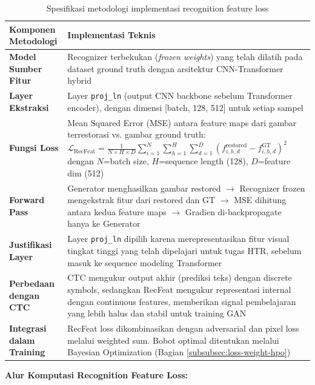 \documentclass[12pt,a4paper]{article}
\begin{document}
\begin{table}[H]
\centering
\caption{Spesifikasi metodologi implementasi recognition feature loss}
\label{tab:recfeat-loss-methodology}
\small
\begin{tabular}{|l|p{10cm}|}
\hline
\textbf{Komponen Metodologi} & \textbf{Implementasi Teknis} \\ \hline
\textbf{Model Sumber Fitur} & Recognizer terbekukan (\textit{frozen weights}) yang telah dilatih pada dataset ground truth dengan arsitektur CNN-Transformer hybrid \\ \hline
\textbf{Layer Ekstraksi} & Layer \texttt{proj\_ln} (output CNN backbone sebelum Transformer encoder), dengan dimensi [batch, 128, 512] untuk setiap sampel \\ \hline
\textbf{Fungsi Loss} & Mean Squared Error (MSE) antara feature maps dari gambar terrestorasi vs. gambar ground truth: 
\newline $\mathcal{L}_{\text{RecFeat}} = \frac{1}{N \times H \times D} \sum_{i=1}^{N} \sum_{h=1}^{H} \sum_{d=1}^{D} (f^{\text{restored}}_{i,h,d} - f^{\text{GT}}_{i,h,d})^2$ 
\newline dengan $N$=batch size, $H$=sequence length (128), $D$=feature dim (512) \\ \hline
\textbf{Forward Pass} & Generator menghasilkan gambar restored $\rightarrow$ Recognizer frozen mengekstrak fitur dari restored dan GT $\rightarrow$ MSE dihitung antara kedua feature maps $\rightarrow$ Gradien di-backpropagate hanya ke Generator \\ \hline
\textbf{Justifikasi Layer} & Layer \texttt{proj\_ln} dipilih karena merepresentasikan fitur visual tingkat tinggi yang telah dipelajari untuk tugas HTR, sebelum masuk ke sequence modeling Transformer \\ \hline
\textbf{Perbedaan dengan CTC} & CTC mengukur output akhir (prediksi teks) dengan discrete symbols, sedangkan RecFeat mengukur representasi internal dengan continuous features, memberikan signal pembelajaran yang lebih halus dan stabil untuk training GAN \\ \hline
\textbf{Integrasi dalam Training} & RecFeat loss dikombinasikan dengan adversarial dan pixel loss melalui weighted sum. Bobot optimal ditentukan melalui Bayesian Optimization (Bagian \ref{subsubsec:loss-weight-hpo}) \\ \hline
\end{tabular}
\end{table}

\textbf{Alur Komputasi Recognition Feature Loss:}
\end{document}
